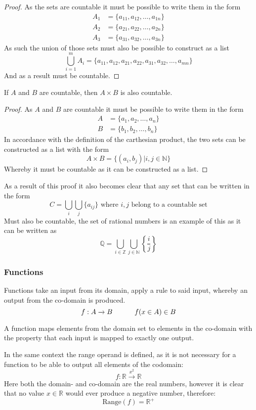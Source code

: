 \begin{proof}
  As the sets are countable it must be possible to write them in the form
  \begin{align*}
      A_1&=\{a_{11},a_{12},\ldots,a_{1n}\} \\
      A_2&=\{a_{21},a_{22},\ldots,a_{2n}\} \\
      A_3&=\{a_{31},a_{32},\ldots,a_{3n}\}
  \end{align*}
  As such the union of those sets must also be possible to construct as a list
  \[
      \bigcup_{i=1}^{m}A_{i}=\{a_{11},a_{12},a_{21},a_{22},a_{31},a_{32},\ldots,a_{mn}\}
  \]
  And as a result must be countable.
\end{proof}
\begin{theorem}
  If $A$ and $B$ are countable, then $A\times B$ is also countable.
\end{theorem}
\begin{proof}
  As $A$ and $B$ are countable it must be possible to write them in the form
  \begin{align*}
      A&=\{a_{1},a_{2},\ldots,a_{n}\} \\
      B&=\{b_{1},b_{2},\ldots,b_{n}\}
  \end{align*}
  In accordance with the definition of the carthesian product, the two sets can be constructed as a list with the form
  \[
      A\times B=\{(a_{i},b_{j})|i,j\in \mathbb{N}\}
  \]
  Whereby it must be countable as it can be constructed as a list.
\end{proof}
As a result of this proof it also becomes clear that any set that can be written in the form
\[
    C=\bigcup_{i}\bigcup_{j}\{a_{ij}\}\text{ where }i,j \text{ belong to a countable set}
\]
Must also be countable, the set of rational numbers is an example of this as it can be written as
\[
    \mathbb{Q}=\bigcup_{i\in \mathbb{Z}}\bigcup_{j\in \mathbb{N}}\left\{\frac{i}{j}\right\}
\]
\subsubsection{Functions}
Functions take an input from its domain, apply a rule to said input, whereby an output from the co-domain is produced.
\[
    f:A\xrightarrow{} B\hskip 32pt f(x\in A)\in B
\]
\begin{definition}
  A function maps elements from the domain set to elements in the co-domain with the property that each input is mapped to exactly one output.
\end{definition}
In the same context the range operand is defined, as it is not necessary for a function to be able to output all elements of the codomain:
\[
    f: \mathbb{R} \xrightarrow{x^{2}} \mathbb{R}
\]
Here both the domain- and co-domain are the real numbers, however it is clear that no value $x\in \mathbb{R}$ would ever produce a negative number, therefore:
\[
    \text{Range}(f)=\mathbb{R}^{+}
\]
